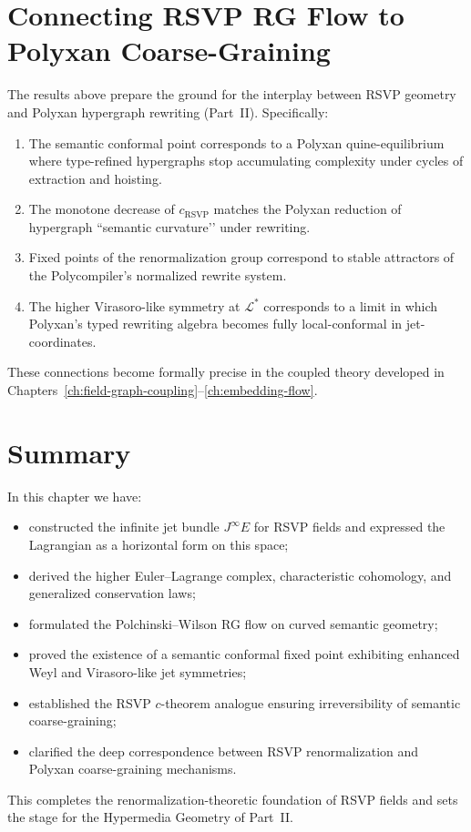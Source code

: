 \section{Connecting RSVP RG Flow to Polyxan Coarse-Graining}

The results above prepare the ground for the interplay between RSVP geometry and
Polyxan hypergraph rewriting (Part~II).  Specifically:

\begin{enumerate}
  \item The semantic conformal point corresponds to a Polyxan quine-equilibrium
        where type-refined hypergraphs stop accumulating complexity under
        cycles of extraction and hoisting.
  \item The monotone decrease of $c_{\mathrm{RSVP}}$ matches the Polyxan
        reduction of hypergraph ``semantic curvature’’ under rewriting.
  \item Fixed points of the renormalization group correspond to stable
        attractors of the Polycompiler’s normalized rewrite system.
  \item The higher Virasoro-like symmetry at $\mathcal{L}^\ast$ corresponds to
        a limit in which Polyxan’s typed rewriting algebra becomes fully
        local-conformal in jet-coordinates.
\end{enumerate}

These connections become formally precise in the coupled theory developed in
Chapters~\ref{ch:field-graph-coupling}–\ref{ch:embedding-flow}.

\section{Summary}

In this chapter we have:

\begin{itemize}
  \item constructed the infinite jet bundle $J^\infty E$ for RSVP fields and
        expressed the Lagrangian as a horizontal form on this space;
  \item derived the higher Euler--Lagrange complex, characteristic cohomology,
        and generalized conservation laws;
  \item formulated the Polchinski--Wilson RG flow on curved semantic geometry;
  \item proved the existence of a semantic conformal fixed point exhibiting
        enhanced Weyl and Virasoro-like jet symmetries;
  \item established the RSVP \(c\)-theorem analogue ensuring irreversibility of
        semantic coarse-graining;
  \item clarified the deep correspondence between RSVP renormalization and
        Polyxan coarse-graining mechanisms.
\end{itemize}

This completes the renormalization-theoretic foundation of RSVP fields and sets
the stage for the Hypermedia Geometry of Part~II.

